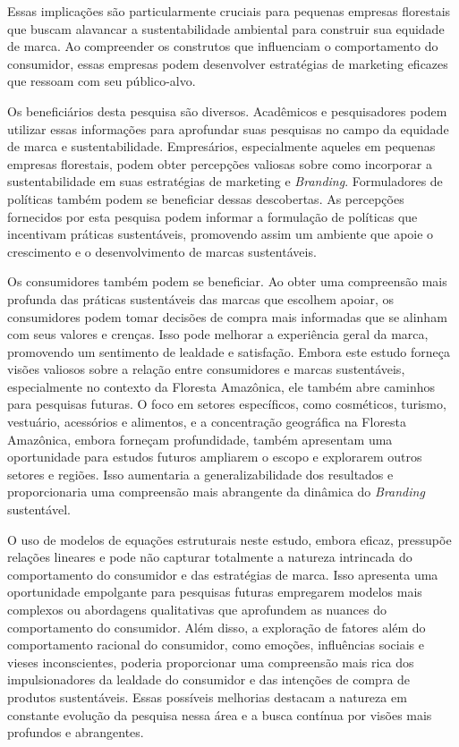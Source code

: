 Essas implicações são particularmente cruciais para pequenas empresas florestais que buscam alavancar a sustentabilidade ambiental para construir sua equidade de marca. Ao compreender os construtos que influenciam o comportamento do consumidor, essas empresas podem desenvolver estratégias de marketing eficazes que ressoam com seu público-alvo.

Os beneficiários desta pesquisa são diversos. Acadêmicos e pesquisadores podem utilizar essas informações para aprofundar suas pesquisas no campo da equidade de marca e sustentabilidade. Empresários, especialmente aqueles em pequenas empresas florestais, podem obter percepções valiosas sobre como incorporar a sustentabilidade em suas estratégias de marketing e \textit{Branding}. Formuladores de políticas também podem se beneficiar dessas descobertas. As percepções fornecidos por esta pesquisa podem informar a formulação de políticas que incentivam práticas sustentáveis, promovendo assim um ambiente que apoie o crescimento e o desenvolvimento de marcas sustentáveis.
 
Os consumidores também podem se beneficiar. Ao obter uma compreensão mais profunda das práticas sustentáveis das marcas que escolhem apoiar, os consumidores podem tomar decisões de compra mais informadas que se alinham com seus valores e crenças. Isso pode melhorar a experiência geral da marca, promovendo um sentimento de lealdade e satisfação.
Embora este estudo forneça visões valiosos sobre a relação entre consumidores e marcas sustentáveis, especialmente no contexto da Floresta Amazônica, ele também abre caminhos para pesquisas futuras. O foco em setores específicos, como cosméticos, turismo, vestuário, acessórios e alimentos, e a concentração geográfica na Floresta Amazônica, embora forneçam profundidade, também apresentam uma oportunidade para estudos futuros ampliarem o escopo e explorarem outros setores e regiões. Isso aumentaria a generalizabilidade dos resultados e proporcionaria uma compreensão mais abrangente da dinâmica do \textit{Branding} sustentável.

O uso de modelos de equações estruturais neste estudo, embora eficaz, pressupõe relações lineares e pode não capturar totalmente a natureza intrincada do comportamento do consumidor e das estratégias de marca. Isso apresenta uma oportunidade empolgante para pesquisas futuras empregarem modelos mais complexos ou abordagens qualitativas que aprofundem as nuances do comportamento do consumidor. Além disso, a exploração de fatores além do comportamento racional do consumidor, como emoções, influências sociais e vieses inconscientes, poderia proporcionar uma compreensão mais rica dos impulsionadores da lealdade do consumidor e das intenções de compra de produtos sustentáveis. Essas possíveis melhorias destacam a natureza em constante evolução da pesquisa nessa área e a busca contínua por visões mais profundos e abrangentes.
